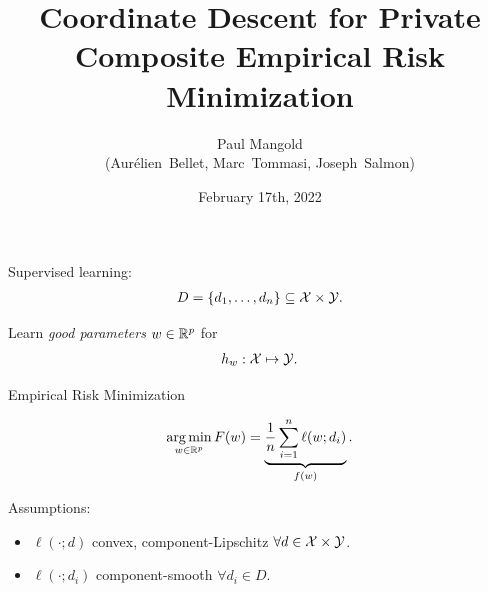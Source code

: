 \documentclass{beamer}
\title{Coordinate Descent for Private Composite Empirical Risk Minimization}
\author{
  Paul Mangold \\[1em]
 (Aurélien~Bellet, Marc~Tommasi, Joseph~Salmon)
}
\institute{\textsc{Magnet Seminar}}
\date{February 17th, 2022}
\begin{document}

\begin{notitle}
  \begin{frame}
    \titlepage
  \end{frame}
  \addtocounter{framenumber}{-1}
\end{notitle}

\begin{frame}
  Supervised learning:
  \begin{align*}
    D = \{d_1, \dots, d_n\} \subseteq \mathcal{X} \times \mathcal{Y}.
  \end{align*}

  \vspace{1em}

  Learn \emph{good parameters} $w \in \mathbb R^p$ for
  \begin{align*}
    h_w : \mathcal{X} \mapsto \mathcal{Y}.
  \end{align*}
\end{frame}

\begin{frame}
  \vspace{-0.5em}
  {\Huge
    \begin{center}
      Empirical Risk Minimization
    \end{center}
  }
  \vspace{-1.5em}
  \begin{align*}
    \operatorname*{arg\,min}_{w \in \mathbb R^p} F(w) = \underbrace{\frac 1n \sum_{i=1}^n \ell(w; d_i)}_{f(w)}.
  \end{align*}


  Assumptions:

  \vspace{0.5em}

  \begin{itemize}[leftmargin=1em,itemsep=0.5em]
    \Large
  \item $\ell(\cdot; d)$ convex, component-Lipschitz $\forall d\in\mathcal{X}\times\mathcal{Y}$.
  \item $\ell(\cdot; d_i)$ component-smooth $\forall d_i\in D$.
  \end{itemize}
\end{frame}
\end{document}
